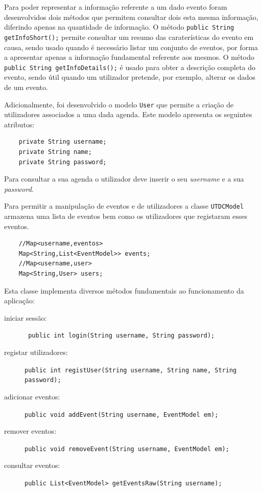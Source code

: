 \documentclass{article}
\begin{document}
Para poder representar a informação referente a um dado evento foram desenvolvidos dois métodos que permitem consultar dois esta mesma informação, diferindo apenas na quantidade de informação.
O método \texttt{public String getInfoShort();} permite consultar um resumo das caraterísticas do evento em causa, sendo usado quando é necessário listar um conjunto de eventos, por forma a apresentar apenas a informação fundamental referente aos mesmos.
O método \texttt{public String getInfoDetails();} é usado para obter a descrição completa do evento, sendo útil quando um utilizador pretende, por exemplo, alterar os dados de um evento.

Adicionalmente, foi desenvolvido o modelo \texttt{User} que permite a criação de utilizadores
associados a uma dada agenda. Este modelo apresenta os seguintes atributos:
\begin{verbatim}
    private String username;
    private String name;
    private String password;    
\end{verbatim}

Para consultar a sua agenda o utilizador deve inserir o seu \textit{username} e a sua \textit{password}.

Para permitir a manipulação de eventos e de utilizadores a classe \texttt{UTDCModel} armazena uma lista de eventos bem como os utilizadores que registaram esses eventos.

\begin{verbatim}
    //Map<username,eventos>
    Map<String,List<EventModel>> events;
    //Map<username,user>
    Map<String,User> users;
\end{verbatim}

Esta classe implementa diversos métodos fundamentais ao funcionamento da aplicação:
\begin{description}
    \item [iniciar sessão:]\texttt{ public int login(String username, String password);} 
    \item [registar utilizadores:]\texttt{public int registUser(String username, String name, String password);}
    \item [adicionar eventos:]\texttt{public void addEvent(String username, EventModel em);} 
    \item [remover eventos:]\texttt{public void removeEvent(String username, EventModel em);}
    \item [consultar eventos:]\texttt{public List<EventModel> getEventsRaw(String username);}
\end{description}
\end{document}
